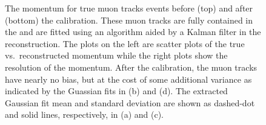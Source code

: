 \begin{figure}[h!]
    \begin{centering}
        \caption[Momentum Calibration for \podtitle{} Fully Contained Muon Tracks]{The momentum for true muon tracks events before (top) and after (bottom) the calibration. These muon tracks are fully contained in the \podtext{} and are fitted using an algorithm aided by a Kalman filter in the \podtext{} reconstruction. The plots on the left are scatter plots of the true vs.\ reconstructed momentum while the right plots show the resolution of the momentum. After the calibration, the muon tracks have nearly no bias, but at the cost of some additional variance as indicated by the Guassian fits in (b) and (d). The extracted Gaussian fit mean and standard deviation are shown as dashed-dot and solid lines, respectively, in (a) and (c).\label{fig:MuonContainedCalibration}}
    \end{centering}
\end{figure}

